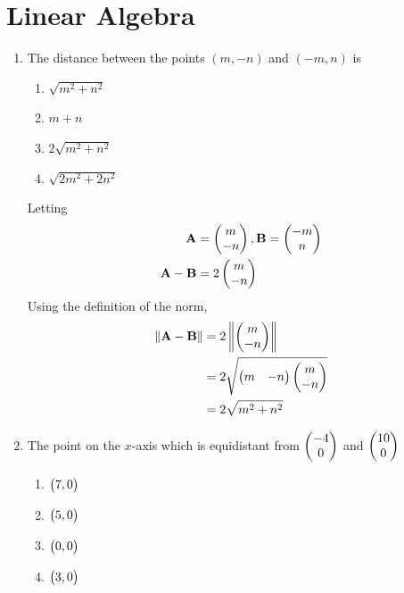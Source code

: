 \documentclass[journal,12pt,twocolumn]{IEEEtran}
\begin{document}
\section{Linear Algebra}
\begin{enumerate}
\item The distance between the points $(m , -n)$ and $(-m , n)$ is
\begin{enumerate}
    \item $\sqrt{m^2 + n^2}$
    \item $m + n$
    \item $2\sqrt{m^2 + n^2}$
    \item $\sqrt{2m^2 + 2n^2}$
\end{enumerate}
		\solution Letting 
		\begin{align}
			\mathbf{A} &= \begin{pmatrix}m \\ -n\end{pmatrix}, \mathbf{B}=\begin{pmatrix}-m \\ n\end{pmatrix}
			\\
			\mathbf{A}-\mathbf{B} &= 2\begin{pmatrix}m \\ -n\end{pmatrix}
		\end{align}
Using the definition   of the norm, 
		\begin{align}
\left\lVert\mathbf{A}-\mathbf{B}\right\rVert &=2\left\lVert\begin{pmatrix}m \\ -n\end{pmatrix}\right\rVert
			\\
			&=2 \sqrt{\begin{pmatrix}m & -n\end{pmatrix}\begin{pmatrix}m \\ -n\end{pmatrix}} 
\\
			&			= 2 \sqrt{m^2+n^2}
		\end{align}

\item The point on the $x$-axis which is equidistant from $\begin{pmatrix}-4 \\ 0\end{pmatrix}$ and $\begin{pmatrix}10\\0\end{pmatrix}$\\
\begin{enumerate}
\item $\begin{pmatrix}7,0\end{pmatrix}$
\item $\begin{pmatrix}5,0\end{pmatrix}$
\item $\begin{pmatrix}0,0\end{pmatrix}$
\item $\begin{pmatrix}3,0\end{pmatrix}$
\end{enumerate}


\end{enumerate}
\end{document}
